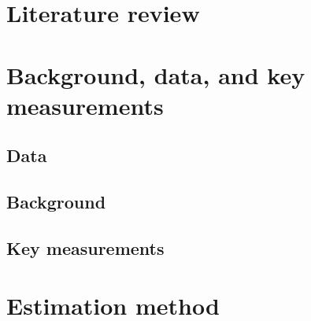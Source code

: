 \documentclass[a4paper,11pt]{article}
\begin{document}
\section{Literature review}\label{lit}

\section{Background, data, and key measurements}\label{bgdata}

\subsection{Data}\label{data}

\subsection{Background}\label{bg}

\subsection{Key measurements}\label{measure}

\begin{landscape}
	
\end{landscape}


\section{Estimation method}\label{method}
\end{document}
